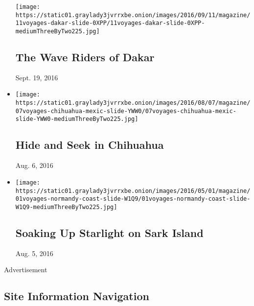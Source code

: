 \begin{itemize}
  \texttt{[image: https://static01.graylady3jvrrxbe.onion/images/2016/09/11/magazine/11voyages-dakar-slide-0XPP/11voyages-dakar-slide-0XPP-mediumThreeByTwo225.jpg]}

  \hypertarget{the-wave-riders-of-dakar}{%
  \subsection{The Wave Riders of Dakar}\label{the-wave-riders-of-dakar}}

  Sept. 19, 2016
\item
  \href{https://www.nytimes3xbfgragh.onion/interactive/2016/08/07/magazine/voyages-hide-and-seek-in-chihuahua.html}{}

  \texttt{[image: https://static01.graylady3jvrrxbe.onion/images/2016/08/07/magazine/07voyages-chihuahua-mexic-slide-YWW0/07voyages-chihuahua-mexic-slide-YWW0-mediumThreeByTwo225.jpg]}

  \hypertarget{hide-and-seek-in-chihuahua}{%
  \subsection{Hide and Seek in
  Chihuahua}\label{hide-and-seek-in-chihuahua}}

  Aug. 6, 2016
\item
  \href{https://www.nytimes3xbfgragh.onion/interactive/2016/04/28/magazine/sark-island-stars.html}{}

  \texttt{[image: https://static01.graylady3jvrrxbe.onion/images/2016/05/01/magazine/01voyages-normandy-coast-slide-W1Q9/01voyages-normandy-coast-slide-W1Q9-mediumThreeByTwo225.jpg]}

  \hypertarget{soaking-up-starlight-on-sark-island}{%
  \subsection{Soaking Up Starlight on Sark
  Island}\label{soaking-up-starlight-on-sark-island}}

  Aug. 5, 2016
\end{itemize}

Advertisement

\hypertarget{site-information-navigation}{%
\subsection{Site Information
Navigation}\label{site-information-navigation}}

